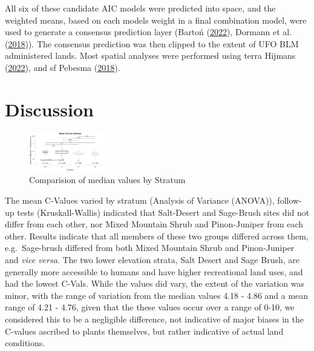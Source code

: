\documentclass[
]{article}
\begin{document}
All six of these candidate AIC models were predicted into space, and the
weighted means, based on each models weight in a final combination
model, were used to generate a consensus prediction layer (Bartoń
(\protect\hyperlink{ref-Barton2022mumin}{2022}), Dormann et al.
(\protect\hyperlink{ref-dormann2018model}{2018})). The consensus
prediction was then clipped to the extent of UFO BLM administered lands.
Most spatial analyses were performed using terra Hijmans
(\protect\hyperlink{ref-hijman2022terra}{2022}), and sf Pebesma
(\protect\hyperlink{ref-pebesma2018sf}{2018}).

\hypertarget{discussion}{%
\section{Discussion}\label{discussion}}

\begin{figure}
  \centering
    \includegraphics[width=0.3\textwidth]{../plots/graphics/Mcoc_boxplot.png}
  \caption{Comparision of median values by Stratum}
\end{figure}

The mean C-Values varied by stratum (Analysis of Variance (ANOVA)),
follow-up tests (Kruskall-Wallis) indicated that Salt-Desert and
Sage-Brush sites did not differ from each other, nor Mixed Mountain
Shrub and Pinon-Juniper from each other. Results indicate that all
members of these two groups differed across them, e.g.~Sage-brush
differed from both Mixed Mountain Shrub and Pinon-Juniper and \emph{vice
versa}. The two lower elevation strata, Salt Desert and Sage Brush, are
generally more accessible to humans and have higher recreational land
uses, and had the lowest C-Vals. While the values did vary, the extent
of the variation was minor, with the range of variation from the median
values 4.18 - 4.86 and a mean range of 4.21 - 4.76, given that the these
values occur over a range of 0-10, we considered this to be a negligible
difference, not indicative of major biases in the C-values ascribed to
plants themselves, but rather indicative of actual land conditions.
\end{document}
